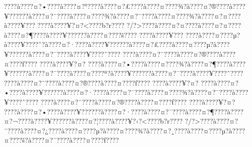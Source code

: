 \documentclass[11pt, openany]{book}
\begin{document}
{{{{{{{{{{{{{{{{{{{{{{{{{{{{{{{{{{{{{{{{{{{{{{{{{{{{{{{{{{{{{{{{{{{{{{{{{{{{{{{{{{{{{{{{{{{{{{{{{{{{{{{{{{{{{???\textbar{}?à???\textbar{}?¤?•???\textbar{}?à???\textbar{}?¤?°???\textbar{}?à???\textbar{}?¤?£???\textbar{}?à???\textbar{}?¤???\textbar{}?¾?à???\textbar{}?¤?®???\textbar{}?à???\textbar{}?¥?????\textbar{}?à???\textbar{}?¤?¨???\textbar{}?à???\textbar{}?¤???\textbar{}?¾?à???\textbar{}?¤?¨???\textbar{}?à???\textbar{}?¤???\textbar{}?¾?à???\textbar{}?¤?¤???\textbar{}?à???\textbar{}?¥???
???\textbar{}?à???\textbar{}?¥?¤?\textless{}???\textbar{}?b?r???\textbar{}?
?/?\textgreater{}???\textbar{}?à???\textbar{}?¤?¤???\textbar{}?à???\textbar{}?¤?¤???\textbar{}?à???\textbar{}?¤?¶???\textbar{}?à???\textbar{}?¥?????\textbar{}?à???\textbar{}?¤???\textbar{}?š???\textbar{}?
???\textbar{}?à???\textbar{}?¥???
???\textbar{}?à???\textbar{}?¤???\textbar{}?µ?à???\textbar{}?¥???\textbar{}?ˆ?à???\textbar{}?¤?·???\textbar{}?à???\textbar{}?¥?????\textbar{}?à???\textbar{}?¤?£???\textbar{}?à???\textbar{}?¤???\textbar{}?µ?à???\textbar{}?¥?????\textbar{}?à???\textbar{}?¤?¯???\textbar{}?à???\textbar{}?¥???\textbar{}?ˆ???\textbar{}?
???\textbar{}?à???\textbar{}?¤?¨???\textbar{}?à???\textbar{}?¤?®???\textbar{}?à???\textbar{}?¤???\textbar{}?ƒ???\textbar{}?
???\textbar{}?à???\textbar{}?¥?¤?
???\textbar{}?à???\textbar{}?¤?•???\textbar{}?à???\textbar{}?¤???\textbar{}?¾?à???\textbar{}?¤?¶???\textbar{}?à???\textbar{}?¥?????\textbar{}?à???\textbar{}?¤?¯???\textbar{}?à???\textbar{}?¤???\textbar{}?ª?à???\textbar{}?¥?????\textbar{}?à???\textbar{}?¤?¯???\textbar{}?à???\textbar{}?¥???\textbar{}?ˆ???\textbar{}?
???\textbar{}?à???\textbar{}?¤?¨???\textbar{}?à???\textbar{}?¤?®???\textbar{}?à???\textbar{}?¤???\textbar{}?ƒ???\textbar{}?
???\textbar{}?à???\textbar{}?¥?¤?
???\textbar{}?à???\textbar{}?¤?•???\textbar{}?à???\textbar{}?¥?????\textbar{}?à???\textbar{}?¤?·???\textbar{}?à???\textbar{}?¤?¯???\textbar{}?à???\textbar{}?¤???\textbar{}?¾?à???\textbar{}?¤?¯???\textbar{}?à???\textbar{}?¥???\textbar{}?ˆ???\textbar{}?
???\textbar{}?à???\textbar{}?¤?¨???\textbar{}?à???\textbar{}?¤?®???\textbar{}?à???\textbar{}?¤???\textbar{}?ƒ???\textbar{}?
???\textbar{}?à???\textbar{}?¥?¤?
???\textbar{}?à???\textbar{}?¤?•???\textbar{}?à???\textbar{}?¥?????\textbar{}?à???\textbar{}?¤?·???\textbar{}?à???\textbar{}?¤?¯???\textbar{}?à???\textbar{}?¤?¶???\textbar{}?à???\textbar{}?¤?¬???\textbar{}?à???\textbar{}?¥?????\textbar{}?à???\textbar{}?¤?¦???\textbar{}?à???\textbar{}?¥?‹?\textless{}???\textbar{}?b?r???\textbar{}?
?/?\textgreater{}???\textbar{}?à???\textbar{}?¤?¨???\textbar{}?à???\textbar{}?¤?¿???\textbar{}?à???\textbar{}?¤???\textbar{}?µ?à???\textbar{}?¤???\textbar{}?¾?à???\textbar{}?¤?¸???\textbar{}?à???\textbar{}?¤???\textbar{}?µ?à???\textbar{}?¤???\textbar{}?š?à???\textbar{}?¤?¨???\textbar{}?à???\textbar{}?¤???\textbar{}?ƒ???\textbar{}?
}}}}}}}}}}}}}}}}}}}}}}}}}}}}}}}}}}}}}}}}}}}}}}}}}}}}}}}}}}}}}}}}}}}}}}}}}}}}}}}}}}}}}}}}}}}}}}}}}}}}}}}}}}}}}
\end{document}
